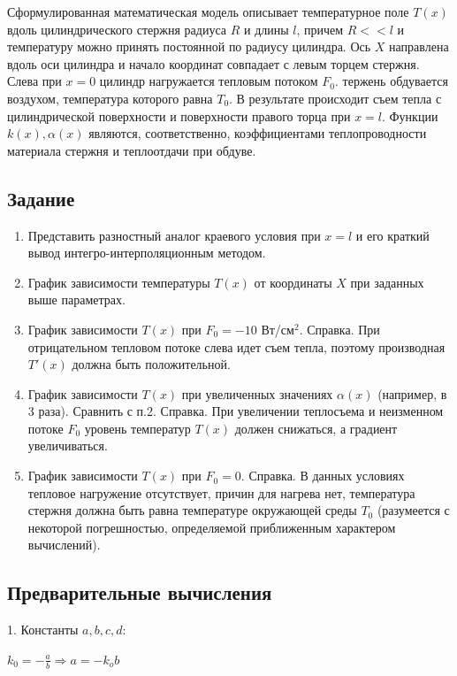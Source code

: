 \documentclass[a4paper,14pt]{article}
\begin{document}
Сформулированная математическая модель описывает температурное поле
$T(x)$ вдоль  цилиндрического стержня радиуса $R$ и длины $l$,
причем $R << l$ и температуру можно принять постоянной по радиусу цилиндра.
Ось $X$ направлена вдоль оси цилиндра и начало координат совпадает с левым торцем стержня.
Слева при $x = 0$ цилиндр нагружается тепловым потоком $F_0$.
тержень обдувается воздухом, температура которого равна $T_0$.
В результате происходит съем тепла с цилиндрической поверхности и поверхности правого торца при $x = l$.
Функции $k(x), \alpha(x)$ являются, соответственно, коэффициентами теплопроводности материала стержня и теплоотдачи при обдуве. 

\subsection*{Задание}

\begin{enumerate}
	\item Представить разностный аналог краевого условия при $x = l$ и его краткий вывод интегро-интерполяционным методом.
	\item График зависимости температуры $T(x)$ от координаты $X$ при заданных выше параметрах.
	\item График зависимости $T(x)$ при $F_0 = -10$ Вт/см$^2$.
	Справка. При отрицательном тепловом потоке слева идет съем тепла, поэтому производная
	$T'(x)$ должна быть положительной.
	\item График зависимости $T(x)$ при увеличенных значениях $\alpha(x)$ (например, в 3 раза). Сравнить с п.2.
		  Справка. При увеличении теплосъема и неизменном потоке $F_0$ уровень температур $T(x)$ должен снижаться, а градиент  увеличиваться.
	\item График зависимости $T(x)$ при $F_0 = 0$.
	Справка. В данных условиях тепловое нагружение отсутствует, причин для нагрева нет, температура стержня должна быть равна температуре окружающей среды
	$T_0$ (разумеется с некоторой погрешностью, определяемой приближенным характером вычислений).
\end{enumerate}


\subsection*{Предварительные вычисления}

1. Константы $a, b, c, d$:

$k_0 = -\frac{a}{b} \Rightarrow a = - k_o b$
\end{document}
